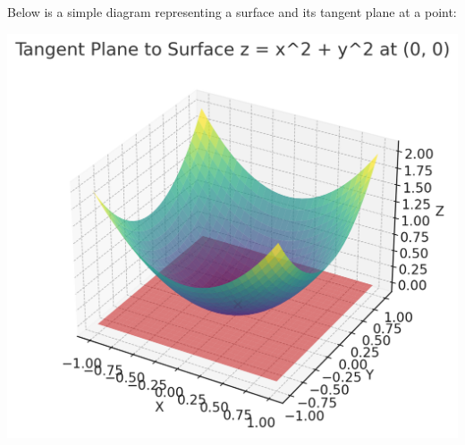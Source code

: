 \documentclass{report}
\begin{document}
Below is a simple diagram representing a surface and its tangent plane at a point:

\begin{center}
	\includegraphics[scale=0.5]{tangentplane.png}
\end{center}
\end{document}
